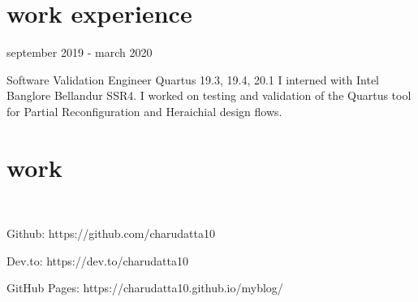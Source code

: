 \documentclass[fontsize=11pt]{tccv}
\begin{document}
\section{work experience}
\begin{fromto}
\item{september 2019 - march 2020}
\end{fromto}
\begin{project}
	\item{Software Validation Engineer}
	{Quartus 19.3, 19.4, 20.1}
	{I interned with Intel Banglore Bellandur SSR4. I worked on testing and validation of the Quartus tool for Partial Reconfiguration and Heraichial design flows.  }
\end{project}
\vspace{2em}

\section{work}
\begin{skills}\\
\item {Github: https://github.com/charudatta10}\\
\item {Dev.to: https://dev.to/charudatta10}\\
\item {GitHub Pages: https://charudatta10.github.io/myblog/}\\
\end{skills}
\vspace{2em}

\end{document}
